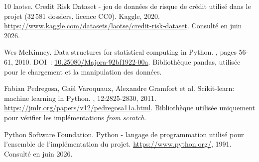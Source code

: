 \documentclass[11pt,a4paper]{article}
\begin{document}
\begin{thebibliography}{10}
laotse.
\newblock Credit Risk Dataset - jeu de données de risque de crédit utilisé dans
  le projet (32\,581 dossiers, licence CC0).
\newblock Kaggle, 2020.
  \url{https://www.kaggle.com/datasets/laotse/credit-risk-dataset}.
  Consulté en juin 2026.

Wes McKinney.
\newblock Data structures for statistical computing in {Python}.
, pages 56-61, 2010.
\newblock DOI~: \href{https://doi.org/10.25080/Majora-92bf1922-00a}{10.25080/Majora-92bf1922-00a}.
  Bibliothèque pandas, utilisée pour le chargement et la manipulation des données.

Fabian Pedregosa, Gaël Varoquaux, Alexandre Gramfort et al.
\newblock Scikit-learn: machine learning in {Python}.
, 12:2825-2830, 2011.
\newblock \url{https://jmlr.org/papers/v12/pedregosa11a.html}.
  Bibliothèque utilisée uniquement pour vérifier les implémentations \emph{from scratch}.

Python Software Foundation.
\newblock Python - langage de programmation utilisé pour l'ensemble de
  l'implémentation du projet.
\newblock \url{https://www.python.org/}, 1991. Consulté en juin 2026.

\end{thebibliography}
\end{document}
